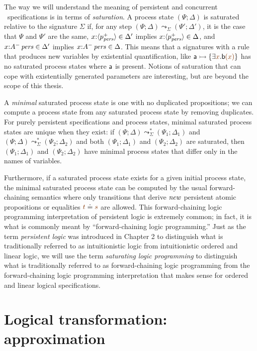 The way we will understand the meaning of persistent and concurrent
\sls~specifications is in terms of {\it saturation}. A process state
$(\Psi; \Delta)$ is saturated relative to the signature $\Sigma$ if,
for any step $(\Psi; \Delta) \leadsto_\Sigma (\Psi'; \Delta')$, it is
the case that $\Psi$ and $\Psi'$ are the same, $x{:}\langle {p^+_{\it pers}} \rangle
\in \Delta'$ implies $x{:}\langle {p^+_{\it pers}} \rangle \in \Delta$, and
$x{:}{A^-}\,{{\it pers}} \in \Delta'$ implies $x{:}{A^-}\,{{\it pers}} \in
\Delta$. This means that a signatures with a rule that
  produces new variables by existential quantification, like ${\sf a}
  \lefti \{ \exists \lf{x}. {\sf b}\lf{(x)} \}$ has no saturated process states
  where ${\sf a}$ is present. Notions of saturation that can cope with
  existentially generated parameters are interesting, but are beyond
  the scope of this thesis.

A {\it minimal} saturated process state
is one with no duplicated propositions; we can compute a process state
from any saturated process state by removing duplicates. For purely
persistent specifications and process states, minimal saturated process
states are unique when they exist: if $(\Psi; \Delta)
\leadsto^*_\Sigma (\Psi_1; \Delta_1)$ and $(\Psi; \Delta)
\leadsto^*_\Sigma (\Psi_2; \Delta_2)$ and both $(\Psi_1; \Delta_1)$
and $(\Psi_2; \Delta_2)$ are saturated, then $(\Psi_1; \Delta_1)$
and $(\Psi_2; \Delta_2)$ have minimal process states that differ only
in the names of variables.

Furthermore, if a saturated process state exists for a given initial
process state, the minimal saturated process state can be computed by
the usual forward-chaining semantics where only transitions that
derive ${\it new}$ persistent atomic propositions or equalities $\lf{t}
\doteq \lf{s}$ are allowed. This forward-chaining logic programming
interpretation of persistent logic is extremely common; in fact, it is
what is commonly meant by ``forward-chaining logic programming.'' Just
as the term {\it persistent logic} was introduced in Chapter 2 to
distinguish what is traditionally referred to as intuitionistic logic
from intuitionistic ordered and linear logic, we will use the term
{\it saturating logic programming} to distinguish what is
traditionally referred to as forward-chaining logic programming from
the forward-chaining logic programming interpretation that makes sense
for ordered and linear logical specifications.

\section{Logical transformation: approximation}
\label{sec:abstraction}

